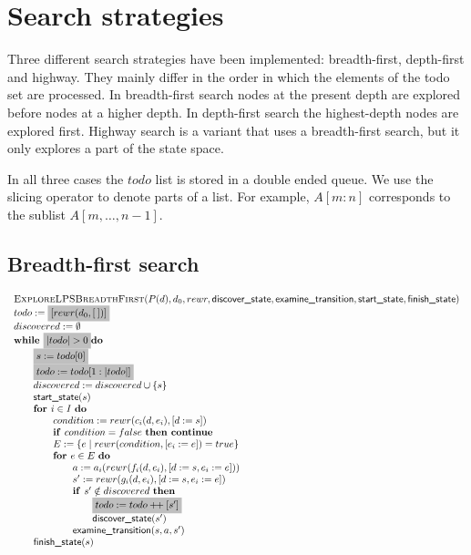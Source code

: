 \documentclass{article}
\newcommand{\concat}{\ensuremath{+\!\!+\:}}
\newcommand{\Space}{\text{\ }}
\newcommand{\If}{\text{\textbf{if }}}
\newcommand{\Do}{\text{\textbf{do }}}
\newcommand{\Then}{\text{\textbf{then }}}
\newcommand{\For}{\text{\textbf{for }}}
\newcommand{\While}{\text{\textbf{while }}}
\newcommand{\Continue}{\text{\textbf{continue }}}
\begin{document}
\newpage
\section{Search strategies}

Three different search strategies have been implemented: breadth-first, depth-first and highway. They mainly differ in the order in which the elements of the todo set are processed. In breadth-first search nodes at the present depth are explored before nodes at a higher depth. In depth-first search the highest-depth nodes are explored first. Highway search is a variant that uses a breadth-first search, but it only explores a part of the state space.

In all three cases the $todo$ list is stored in a double ended queue. We use the slicing operator to denote parts of a list. For example, $A[m:n]$ corresponds to the sublist $A[m,\ldots,n-1]$.

\subsection{Breadth-first search}
\[
\begin{tabular}{l}
\textsc{ExploreLPSBreadthFirst}($P(d), d_0, rewr, \textsf{discover\_state}, \textsf{examine\_transition},
\textsf{start\_state}, \textsf{finish\_state})$ \\
$todo := \colorbox{lightgray}{$[rewr(d_0, [\:])]$}$ \\
$discovered := \emptyset$ \\
$\While \colorbox{lightgray}{$|todo| > 0$} \Do$ \\
\qquad \colorbox{lightgray}{$s := todo[0]$} \\
\qquad \colorbox{lightgray}{$todo := todo[1:|todo|]$} \\
\qquad $discovered := discovered \cup \{s\}$ \\
\qquad $\textsf{start\_state}(s)$ \\
\qquad $\For i \in I  \Space \Do$ \\
\qquad \qquad $condition := rewr(c_i(d, e_i), [d := s])$ \\
\qquad \qquad $\If condition = false  \Space \Then \Continue$ \\
\qquad \qquad $E := \{ e \mid rewr(condition, [e_i := e]) = true \}$ \\
\qquad \qquad $\For e \in E  \Space \Do$ \\
\qquad \qquad \qquad $a := a_i(rewr(f_i(d,e_i), [d:=s,e_i:=e]))$ \\
\qquad \qquad \qquad $s' := rewr(g_i(d,e_i), [d:=s,e_i:=e])$ \\
\qquad \qquad \qquad $\If s' \notin discovered \Space \Then$ \\
\qquad \qquad \qquad \qquad \colorbox{lightgray}{$todo := todo \concat [s']$} \\
\qquad \qquad \qquad \qquad $\textsf{discover\_state}(s')$ \\
\qquad \qquad \qquad $\textsf{examine\_transition}(s, a, s')$ \\
\qquad $\textsf{finish\_state}(s)$ \\
\end{tabular}
\]
\end{document}
